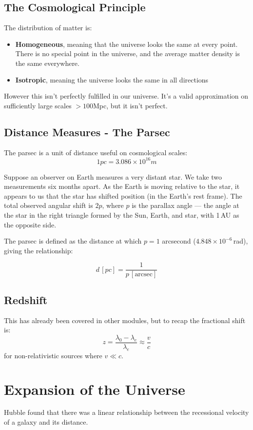 \subsection{The Cosmological Principle}
The distribution of matter is:
\begin{itemize}
    \item \textbf{Homogeneous}, meaning that the universe looks the same at every point. There is no special point in the universe, and the average matter density is the same everywhere.
    \item \textbf{Isotropic}, meaning the universe looks the same in all directions
\end{itemize}

However this isn't perfectly fulfilled in our universe. It's a valid approximation on sufficiently large scales $>100$Mpc, but it isn't perfect.

\subsection{Distance Measures - The Parsec}

The parsec is a unit of distance useful on cosmological scales:
\[
    1 \si{pc} = 3.086 \times 10^{16} \si{m}
\]

Suppose an observer on Earth measures a very distant star. We take two measurements six months apart. As the Earth is moving relative to the star, it appears to us that the star has shifted position (in the Earth's rest frame). The total observed angular shift is $2p$, where $p$ is the parallax angle --- the angle at the star in the right triangle formed by the Sun, Earth, and star, with 1\,AU as the opposite side.

The parsec is defined as the distance at which $p = 1$ arcsecond ($4.848 \times 10^{-6}$\,rad), giving the relationship:

\[
    d\,[\si{pc}] = \frac{1}{p\,[\text{arcsec}]}
\]

\subsection{Redshift}
This has already been covered in other modules, but to recap the fractional shift is:
\[
    z = \frac{\lambda_0 - \lambda_e}{\lambda_e} \approx \frac{v}{c}
\]
for non-relativistic sources where $v \ll c$.

\section{Expansion of the Universe}
Hubble found that there was a linear relationship between the recessional velocity of a galaxy and its distance.


